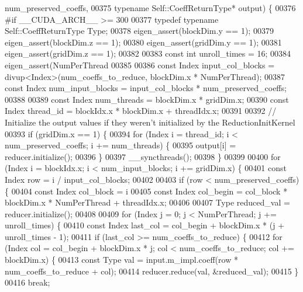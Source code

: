 \begin{DoxyCode}
      num\_preserved\_coeffs,
00375                                          \textcolor{keyword}{typename} Self::CoeffReturnType* output) \{
00376 \textcolor{preprocessor}{#if \_\_CUDA\_ARCH\_\_ >= 300}
00377   \textcolor{keyword}{typedef} \textcolor{keyword}{typename} Self::CoeffReturnType Type;
00378   eigen\_assert(blockDim.y == 1);
00379   eigen\_assert(blockDim.z == 1);
00380   eigen\_assert(gridDim.y == 1);
00381   eigen\_assert(gridDim.z == 1);
00382 
00383   \textcolor{keyword}{const} \textcolor{keywordtype}{int} unroll\_times = 16;
00384   eigen\_assert(NumPerThread %
00385 
00386   \textcolor{keyword}{const} Index input\_col\_blocks = divup<Index>(num\_coeffs\_to\_reduce, blockDim.x * NumPerThread);
00387   \textcolor{keyword}{const} Index num\_input\_blocks = input\_col\_blocks * num\_preserved\_coeffs;
00388 
00389   \textcolor{keyword}{const} Index num\_threads = blockDim.x * gridDim.x;
00390   \textcolor{keyword}{const} Index thread\_id = blockIdx.x * blockDim.x + threadIdx.x;
00391 
00392   \textcolor{comment}{// Initialize the output values if they weren't initialized by the ReductionInitKernel}
00393   \textcolor{keywordflow}{if} (gridDim.x == 1) \{
00394     \textcolor{keywordflow}{for} (Index i = thread\_id; i < num\_preserved\_coeffs; i += num\_threads) \{
00395       output[i] = reducer.initialize();
00396     \}
00397     \_\_syncthreads();
00398   \}
00399 
00400   \textcolor{keywordflow}{for} (Index i = blockIdx.x; i < num\_input\_blocks; i += gridDim.x) \{
00401     \textcolor{keyword}{const} Index row = i / input\_col\_blocks;
00402 
00403     \textcolor{keywordflow}{if} (row < num\_preserved\_coeffs) \{
00404       \textcolor{keyword}{const} Index col\_block = i %
00405       \textcolor{keyword}{const} Index col\_begin = col\_block * blockDim.x * NumPerThread + threadIdx.x;
00406 
00407       Type reduced\_val = reducer.initialize();
00408 
00409       \textcolor{keywordflow}{for} (Index j = 0; j < NumPerThread; j += unroll\_times) \{
00410         \textcolor{keyword}{const} Index last\_col = col\_begin + blockDim.x * (j + unroll\_times - 1);
00411         \textcolor{keywordflow}{if} (last\_col >= num\_coeffs\_to\_reduce) \{
00412           \textcolor{keywordflow}{for} (Index col = col\_begin + blockDim.x * j; col < num\_coeffs\_to\_reduce; col += blockDim.x) \{
00413             \textcolor{keyword}{const} Type val = input.m\_impl.coeff(row * num\_coeffs\_to\_reduce + col);
00414             reducer.reduce(val, &reduced\_val);
00415           \}
00416           \textcolor{keywordflow}{break};

\end{DoxyCode}
